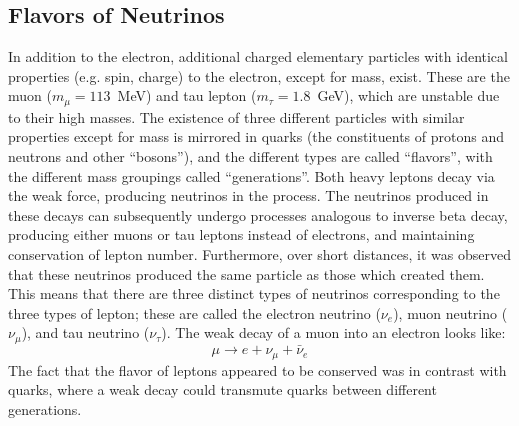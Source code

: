 \documentclass[/main.tex]{subfiles}
\begin{document}
\subsection{Flavors of Neutrinos}
In addition to the electron, additional charged elementary particles with identical properties (e.g. spin, charge) to the electron, except for mass, exist\cite{PDG2018}.
These are the muon ($m_\mu=113$~MeV) and tau lepton ($m_\tau=1.8$~GeV), which are unstable due to their high masses.
The existence of three different particles with similar properties except for mass is mirrored in quarks (the constituents of protons and neutrons and other ``bosons''), and the different types are called ``flavors'', with the different mass groupings called ``generations''.
Both heavy leptons decay via the weak force, producing neutrinos in the process.
The neutrinos produced in these decays can subsequently undergo processes analogous to inverse beta decay, producing either muons or tau leptons instead of electrons, and maintaining conservation of lepton number.
Furthermore, over short distances, it was observed that these neutrinos produced the same particle as those which created them.
This means that there are three distinct types of neutrinos corresponding to the three types of lepton; these are called the electron neutrino ($\nu_e$), muon neutrino ($\nu_\mu$), and tau neutrino ($\nu_\tau$).
The weak decay of a muon into an electron looks like:
\begin{equation}
  \mu \rightarrow e + \nu_\mu + \bar \nu_e
\end{equation}
The fact that the flavor of leptons appeared to be conserved was in contrast with quarks, where a weak decay could transmute quarks between different generations.
\end{document}
